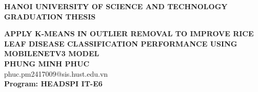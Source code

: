 \documentclass[report_main.tex]{subfiles}
\begin{document}
\begin{titlepage}
\thispagestyle{empty}
\begin{center}

{\textbf{\large{HANOI UNIVERSITY OF SCIENCE AND TECHNOLOGY}}}\\[4cm]

{\textbf{\huge{GRADUATION THESIS}}}\\[1cm]
{\textbf{\Large{APPLY K-MEANS IN OUTLIER REMOVAL TO IMPROVE RICE LEAF 
DISEASE CLASSIFICATION PERFORMANCE USING MOBILENETV3 MODEL}}\\[1cm]


{\textbf{\large{PHUNG MINH PHUC}}}\\
{\large{phuc.pm2417009@sis.hust.edu.vn}}\\[0.5cm]

{\textbf{\large{Program: HEADSPI IT-E6
}}}\\

\vspace{0cm}
\begin{table}[H]
\centering
{}
\end{table}}
\end{center}



\end{titlepage}
\end{document}
